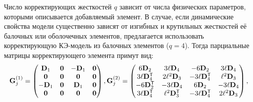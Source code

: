 Число корректирующих жесткостей $ q $ зависит от числа физических параметров, которыми описывается добавляемый элемент. В случае, если динамические свойства модели существенно зависят от изгибных и крутильных жесткостей её балочных или оболочечных элементов, предлагается использовать корректирующую КЭ-модель из балочных элементов ($ q = 4 $). Тогда парциальные матрицы корректирующего элемента примут вид:
\begin{equation*}
	\mathbf{G}_j^{(1)} =
	\begin{pmatrix}
		\mathbf{D}_1 & \mathbf{0} & -\mathbf{D}_1 & \mathbf{0} \\
		\mathbf{0} & \mathbf{0} & \mathbf{0} & \mathbf{0} \\
		-\mathbf{D}_1 & \mathbf{0} & \mathbf{D}_1 & \mathbf{0} \\
		\mathbf{0} & \mathbf{0} & \mathbf{0} & \mathbf{0} \\
	\end{pmatrix},
	\mathbf{G}_j^{(2)} =
	\begin{pmatrix}
		6 \mathbf{D}_2 & 3 \ell \mathbf{D}_4 & -6 \mathbf{D}_2 & 3 \ell \mathbf{D}_4 \\
		3 \ell \mathbf{D} ^ \mathsf{T}_4 & 2 \ell ^ 2 \mathbf{D}_3 & -3 \ell \mathbf{D} ^ \mathsf{T}_4 & \ell ^ 2 \mathbf{D}_3 \\
		-6 \mathbf{D} ^ \mathsf{T}_2 & -3 \ell \mathbf{D}_4 & 6 \mathbf{D}_2 & -3 \ell \mathbf{D}_4 \\
		3 \ell \mathbf{D} ^ \mathsf{T}_4 & \ell ^ 2 \mathbf{D} ^ \mathsf{T}_3 & -3 \ell \mathbf{D} ^ \mathsf{T}_4 & 2 \ell ^ 2 \mathbf{D}_3
	\end{pmatrix},
\end{equation*}

